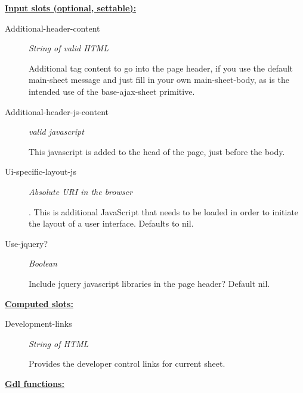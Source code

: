 \documentclass [11pt]{book}
\begin{document}
\begin{itemize}
\textbf{
\underline{Input slots (optional, settable):}}

\begin{description}

\item [Additional-header-content]
\emph{String of valid HTML}

 Additional tag content to go into the page header,
if you use the default main-sheet message and just fill in your own main-sheet-body, as
is the intended use of the base-ajax-sheet primitive.




\item [Additional-header-js-content]
\emph{valid javascript}

 This javascript is added to the head of the page, just before the body.




\item [Ui-specific-layout-js]
\emph{Absolute URI in the browser}

.
This is additional JavaScript that needs to be loaded in order to initiate the layout of a user
interface. Defaults to nil.




\item [Use-jquery?]
\emph{Boolean}

 Include jquery javascript libraries in the page header?
Default nil.




\end{description}






\textbf{
\underline{Computed slots:}}

\begin{description}

\item [Development-links]
\emph{String of HTML}

 Provides the developer control links for current sheet.




\end{description}






\textbf{
\underline{Gdl functions:}}


\end{itemize}
\end{document}
